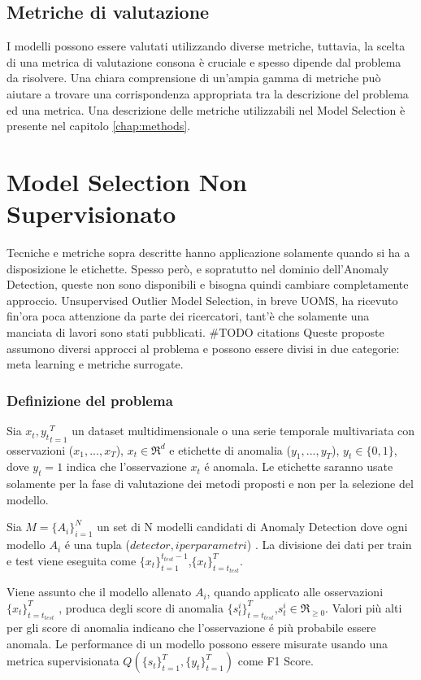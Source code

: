 \subsection{Metriche di valutazione}
I modelli possono essere valutati utilizzando diverse metriche, tuttavia, la scelta di una metrica di valutazione consona è cruciale e spesso dipende dal problema da risolvere. Una chiara comprensione di un'ampia gamma di metriche può aiutare a trovare una corrispondenza appropriata tra la descrizione del problema ed una metrica.
Una descrizione delle metriche utilizzabili nel Model Selection è presente nel capitolo \ref{chap:methods}.

\section{Model Selection Non Supervisionato}
Tecniche e metriche sopra descritte hanno applicazione solamente quando si ha a disposizione le etichette. Spesso però, e sopratutto nel dominio dell'Anomaly Detection, queste non sono disponibili e bisogna quindi cambiare completamente approccio. 
Unsupervised Outlier Model Selection, in breve UOMS, ha ricevuto fin'ora poca attenzione da parte dei ricercatori, tant'è che solamente una manciata di lavori sono stati pubblicati. \#TODO citations Queste proposte assumono diversi approcci al problema e possono essere divisi in due categorie: meta learning e metriche surrogate.

\subsubsection{Definizione del problema}
Sia \({x_t,y_t}^T_{t=1}\) un dataset multidimensionale o una serie temporale multivariata con osservazioni (\(x_1,...,x_T\)), \(x_t\in\Re^d\) e etichette di anomalia (\(y_1,...,y_T\)), \(y_t \in \{0,1\}\), dove \(y_t=1\) indica che l'osservazione \(x_t\) é anomala. Le etichette saranno usate solamente per la fase di valutazione dei metodi proposti e non per la selezione del modello.

Sia \(M=\{A_i\}^N_{i=1}\) un set di N modelli candidati di Anomaly Detection dove ogni modello \(A_i\) é una tupla (\(detector, iperparametri\)) .
La divisione dei dati per train e test viene eseguita come \(\{x_t\}_{t=1}^{t_{test}-1}\),\(\{x_t\}^{T}_{t=t_{test}}\).

Viene assunto che il modello allenato \(A_i\), quando applicato alle osservazioni \(\{x_t\}^{T}_{t=t_{test}}\) , produca degli score di anomalia \(\{s_t^i\}_{t=t_{test}}^T\),\(s^i_t\in\Re_{\geq0}\). Valori più alti per gli score di anomalia indicano che l'osservazione é più probabile essere anomala.
Le performance di un modello possono essere misurate usando una metrica supervisionata \(Q(\{s_t\}^T_{t=1},\{y_t\}^T_{t=1})\) come F1 Score.

